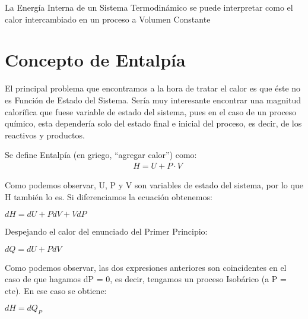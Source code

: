 \begin{definition}
	La Energía Interna de un Sistema Termodinámico se puede interpretar como el calor intercambiado en un proceso a Volumen Constante
\end{definition}

\section{Concepto de Entalpía}

El principal problema que encontramos a la hora de tratar el calor es que éste no es Función de Estado del Sistema. Sería muy interesante encontrar una magnitud calorífica que fuese variable de estado del sistema, pues en el caso de un proceso químico, esta dependería solo del estado final e inicial del proceso, es decir, de los reactivos y productos.\\
\begin{definition}[]
	Se define Entalpía (en griego, “agregar calor”) como:
	\begin{align}
		& H = U + P\cdot V
	\end{align}
\end{definition}

Como podemos observar, U, P y V son variables de estado del sistema, por lo que H también lo es. Si diferenciamos la ecuación obtenemos:\\

\begin{center}
	$dH = dU + PdV + VdP$\\
\end{center}

Despejando el calor del enunciado del Primer Principio:\\

\begin{center}

$dQ = dU + PdV$\\

\end{center}

Como podemos observar, las dos expresiones anteriores son coincidentes en el caso de que hagamos dP = 0, es decir, tengamos un proceso Isobárico (a P = cte). En ese caso se obtiene:\\

\begin{center}
	$dH =dQ_P$\\
\end{center}

